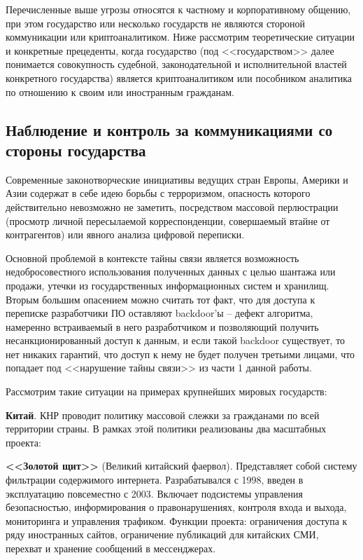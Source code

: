 	Перечисленные выше угрозы относятся к частному и корпоративному общению, при этом государство или несколько государств не являются  стороной коммуникации или криптоаналитиком. Ниже рассмотрим теоретические ситуации и конкретные прецеденты, когда государство (под <<государством>> далее понимается совокупность судебной, законодательной и исполнительной властей конкретного государства) является криптоаналитиком или пособником аналитика по отношению к своим или иностранным гражданам. 
	\subsection{Наблюдение и контроль  за коммуникациями  со стороны государства}
	
	Современные законотворческие инициативы  ведущих стран Европы, Америки и Азии содержат в себе идею борьбы с терроризмом, опасность которого действительно невозможно не заметить, посредством массовой перлюстрации (просмотр личной пересылаемой корреспонденции, совершаемый втайне от контрагентов) или явного анализа цифровой переписки. 
	
	Основной проблемой в контексте тайны связи является возможность недобросовестного использования полученных данных с целью шантажа или  продажи, утечки из государственных информационных систем и хранилищ. Вторым большим опасением можно считать тот факт, что для доступа к переписке разработчики ПО оставляют backdoor'ы -- дефект алгоритма,  намеренно встраиваемый  в него разработчиком и позволяющий  получить несанкционированный доступ к данным, и если такой backdoor существует, то нет никаких гарантий, что доступ к нему не будет получен третьими лицами, что попадает под <<нарушение тайны связи>> из части 1 данной работы.

	Рассмотрим такие ситуации на примерах крупнейших мировых государств:
		
	 \textbf{Китай}. КНР проводит политику массовой слежки за гражданами по всей территории страны. В рамках этой политики реализованы два масштабных проекта: 
	
	\textbf{<<Золотой щит>>} (Великий китайский фаервол). Представляет собой  систему фильтрации содержимого интернета. Разрабатывался с 1998, введен в эксплуатацию повсеместно с 2003. Включает подсистемы управления безопасностью, информирования о правонарушениях, контроля входа и выхода, мониторинга и управления трафиком.  Функции проекта: ограничения доступа к ряду иностранных сайтов, ограничение публикаций для китайских СМИ, перехват и хранение сообщений в мессенджерах.
	
